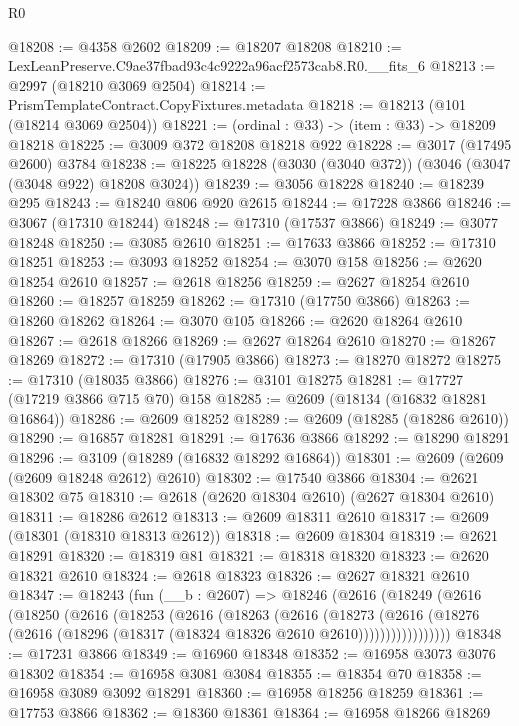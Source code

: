 \begin{lexlean}{R0}
\begin{coremodule}
@18208 := @4358 @2602
@18209 := @18207 @18208
@18210 := LexLeanPreserve.C9ae37fbad93c4c9222a96acf2573cab8.R0.__fits_6
@18213 := @2997 (@18210 @3069 @2504)
@18214 := PrismTemplateContract.CopyFixtures.metadata
@18218 := @18213 (@101 (@18214 @3069 @2504))
@18221 := (ordinal : @33) -> (item : @33) -> @18209 @18218
@18225 := @3009 @372 @18208 @18218 @922
@18228 := @3017 (@17495 @2600) @3784
@18238 := @18225 @18228 (@3030 (@3040 @372)) (@3046 (@3047 (@3048 @922) @18208 @3024))
@18239 := @3056 @18228
@18240 := @18239 @295
@18243 := @18240 @806 @920 @2615
@18244 := @17228 @3866
@18246 := @3067 (@17310 @18244)
@18248 := @17310 (@17537 @3866)
@18249 := @3077 @18248
@18250 := @3085 @2610
@18251 := @17633 @3866
@18252 := @17310 @18251
@18253 := @3093 @18252
@18254 := @3070 @158
@18256 := @2620 @18254 @2610
@18257 := @2618 @18256
@18259 := @2627 @18254 @2610
@18260 := @18257 @18259
@18262 := @17310 (@17750 @3866)
@18263 := @18260 @18262
@18264 := @3070 @105
@18266 := @2620 @18264 @2610
@18267 := @2618 @18266
@18269 := @2627 @18264 @2610
@18270 := @18267 @18269
@18272 := @17310 (@17905 @3866)
@18273 := @18270 @18272
@18275 := @17310 (@18035 @3866)
@18276 := @3101 @18275
@18281 := @17727 (@17219 @3866 @715 @70) @158
@18285 := @2609 (@18134 (@16832 @18281 @16864))
@18286 := @2609 @18252
@18289 := @2609 (@18285 (@18286 @2610))
@18290 := @16857 @18281
@18291 := @17636 @3866
@18292 := @18290 @18291
@18296 := @3109 (@18289 (@16832 @18292 @16864))
@18301 := @2609 (@2609 (@2609 @18248 @2612) @2610)
@18302 := @17540 @3866
@18304 := @2621 @18302 @75
@18310 := @2618 (@2620 @18304 @2610) (@2627 @18304 @2610)
@18311 := @18286 @2612
@18313 := @2609 @18311 @2610
@18317 := @2609 (@18301 (@18310 @18313 @2612))
@18318 := @2609 @18304
@18319 := @2621 @18291
@18320 := @18319 @81
@18321 := @18318 @18320
@18323 := @2620 @18321 @2610
@18324 := @2618 @18323
@18326 := @2627 @18321 @2610
@18347 := @18243
    (fun (__b : @2607) =>
    @18246
      (@2616
        (@18249
          (@2616
            (@18250
              (@2616
                (@18253
                  (@2616
                    (@18263
                      (@2616
                        (@18273
                          (@2616
                            (@18276
                              (@2616 (@18296 (@18317 (@18324 @18326 @2610 @2610)))))))))))))))))
@18348 := @17231 @3866
@18349 := @16960 @18348
@18352 := @16958 @3073 @3076 @18302
@18354 := @16958 @3081 @3084
@18355 := @18354 @70
@18358 := @16958 @3089 @3092 @18291
@18360 := @16958 @18256 @18259
@18361 := @17753 @3866
@18362 := @18360 @18361
@18364 := @16958 @18266 @18269

\end{coremodule}
\end{lexlean}
